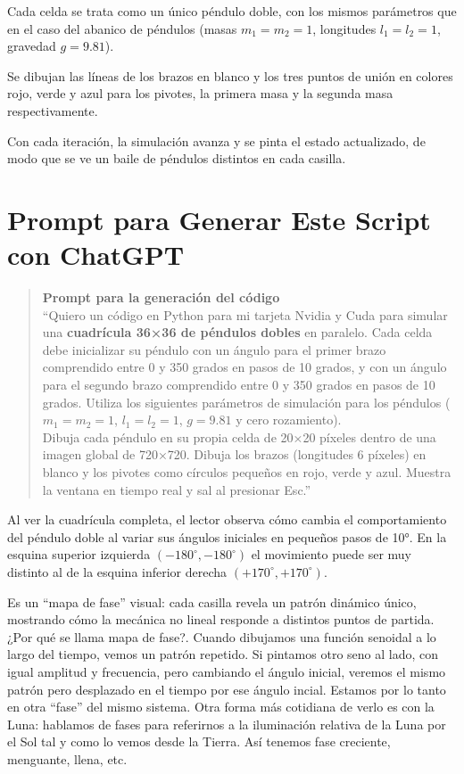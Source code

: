 \documentclass[
  10pt,
  a4paper,
  DIV=11,
  numbers=noendperiod,
  open=any]{scrreprt}
\numberwithin{equation}{chapter}
\numberwithin{equation}{chapter}
\renewcommand{\[}{\begin{equation}}
\renewcommand{\]}{\end{equation}}
\begin{document}
Cada celda se trata como un único péndulo doble, con los mismos
parámetros que en el caso del abanico de péndulos (masas \(m_1=m_2=1\),
longitudes \(l_1=l_2=1\), gravedad \(g=9.81\)).

Se dibujan las líneas de los brazos en blanco y los tres puntos de unión
en colores rojo, verde y azul para los pivotes, la primera masa y la
segunda masa respectivamente.

Con cada iteración, la simulación avanza y se pinta el estado
actualizado, de modo que se ve un baile de péndulos distintos en cada
casilla.

\section{Prompt para Generar Este Script con
ChatGPT}\label{prompt-para-generar-este-script-con-chatgpt}

\begin{quote}
\textbf{Prompt para la generación del código}\\
``Quiero un código en Python para mi tarjeta Nvidia y Cuda para simular
una \textbf{cuadrícula 36×36 de péndulos dobles} en paralelo. Cada celda
debe inicializar su péndulo con un ángulo para el primer brazo
comprendido entre 0 y 350 grados en pasos de 10 grados, y con un ángulo
para el segundo brazo comprendido entre 0 y 350 grados en pasos de 10
grados. Utiliza los siguientes parámetros de simulación para los
péndulos (\(m_1 = m_2 = 1\), \(l_1 = l_2 = 1\), \(g = 9.81\) y cero
rozamiento).\\
Dibuja cada péndulo en su propia celda de 20×20 píxeles dentro de una
imagen global de 720×720. Dibuja los brazos (longitudes 6 píxeles) en
blanco y los pivotes como círculos pequeños en rojo, verde y azul.
Muestra la ventana en tiempo real y sal al presionar Esc.''
\end{quote}

Al ver la cuadrícula completa, el lector observa cómo cambia el
comportamiento del péndulo doble al variar sus ángulos iniciales en
pequeños pasos de 10°. En la esquina superior izquierda
\((-180^\circ,-180^\circ)\) el movimiento puede ser muy distinto al de
la esquina inferior derecha \((+170^\circ,+170^\circ)\).

Es un ``mapa de fase'' visual: cada casilla revela un patrón dinámico
único, mostrando cómo la mecánica no lineal responde a distintos puntos
de partida. ¿Por qué se llama mapa de fase?. Cuando dibujamos una
función senoidal a lo largo del tiempo, vemos un patrón repetido. Si
pintamos otro seno al lado, con igual amplitud y frecuencia, pero
cambiando el ángulo inicial, veremos el mismo patrón pero desplazado en
el tiempo por ese ángulo incial. Estamos por lo tanto en otra ``fase''
del mismo sistema. Otra forma más cotidiana de verlo es con la Luna:
hablamos de fases para referirnos a la iluminación relativa de la Luna
por el Sol tal y como lo vemos desde la Tierra. Así tenemos fase
creciente, menguante, llena, etc.
\end{document}
